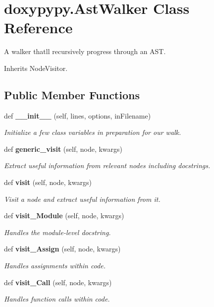\section{doxypypy.\+Ast\+Walker Class Reference}
\label{classdoxypypy_1_1_ast_walker}


A walker that\textquotesingle{}ll recursively progress through an A\+ST.  




Inherits Node\+Visitor.

\subsection*{Public Member Functions}
\begin{DoxyCompactItemize}
\item 
def {\bf \+\_\+\+\_\+init\+\_\+\+\_\+} (self, lines, options, in\+Filename)
\begin{DoxyCompactList}\small\item\em Initialize a few class variables in preparation for our walk. \end{DoxyCompactList}\item 
def {\bf generic\+\_\+visit} (self, node, kwargs)
\begin{DoxyCompactList}\small\item\em Extract useful information from relevant nodes including docstrings. \end{DoxyCompactList}\item 
def {\bf visit} (self, node, kwargs)
\begin{DoxyCompactList}\small\item\em Visit a node and extract useful information from it. \end{DoxyCompactList}\item 
def {\bf visit\+\_\+\+Module} (self, node, kwargs)
\begin{DoxyCompactList}\small\item\em Handles the module-\/level docstring. \end{DoxyCompactList}\item 
def {\bf visit\+\_\+\+Assign} (self, node, kwargs)
\begin{DoxyCompactList}\small\item\em Handles assignments within code. \end{DoxyCompactList}\item 
def {\bf visit\+\_\+\+Call} (self, node, kwargs)
\begin{DoxyCompactList}\small\item\em Handles function calls within code. \end{DoxyCompactList}\item 

\end{DoxyCompactItemize}
